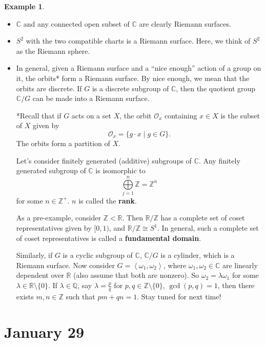 \documentclass[12pt]{article}
\newcommand{\z}{\mathbb{Z}}
\newcommand{\q}{\mathbb{Q}}
\newcommand{\cx}{\mathbb{C}}
\newcommand{\real}{\mathbb{R}}
\newcommand{\vbrack}[1]{\left \langle #1 \right \rangle}
\theoremstyle{definition}
\newtheorem{example}[theorem]{Example}
\theoremstyle{remark}
\begin{document}
\begin{example}
    \noindent
    \begin{itemize}
        \item $\cx$ and any connected open subset of $\cx$ are clearly Riemann surfaces.
        \item $S^2$ with the two compatible charts is a Riemann surface. Here, we think of $S^2$ as the Riemann sphere.
        \item In general, given a Riemann surface and a ``nice enough'' action of a group on it, the orbits* form a Riemann surface. By nice enough, we mean that the orbits are discrete. If $G$ is a discrete subgroup of $\cx$, then the quotient group $\cx/G$ can be made into a Riemann surface.
        
        *Recall that if $G$ acts on a set $X$, the orbit $\mathcal{O}_x$ containing $x\in X$ is the subset of $X$ given by 
        \[\mathcal{O}_x=\{g\cdot x\mid g\in G\}.\]
        The orbits form a partition of $X$.
        
        Let's consider finitely generated (additive) subgroups of $\cx$. Any finitely generated subgroup of $\cx$ is isomorphic to 
        \begin{equation}
            \bigoplus\limits_{j=1}^n\z=\z^n
        \end{equation}
        for some $n\in\z^+$. $n$ is called the \textbf{rank}.
        
        As a pre-example, consider $\z<\real$. Then $\real/\z$ has a complete set of coset representatives given by $[0,1)$, and $\real/\z\cong S^1$. In general, such a complete set of coset representatives is called a \textbf{fundamental domain}.
        
        Similarly, if $G$ is a cyclic subgroup of $\cx$, $\cx/G$ is a cylinder, which is a Riemann surface. Now consider $G=\vbrack{\omega_1,\omega_2}$, where $\omega_1,\omega_2\in\cx$ are linearly dependent over $\real$ (also assume that both are nonzero). So $\omega_2=\lambda\omega_1$ for some $\lambda\in\real\setminus\{0\}$. If $\lambda\in\q$, say $\lambda=\frac{p}{q}$ for $p,q\in\z\setminus\{0\}$, $\gcd(p,q)=1$, then there exists $m,n\in\z$ such that $pm+qn=1$. Stay tuned for next time!
    \end{itemize}
\end{example}
\section{January 29}
\end{document}
